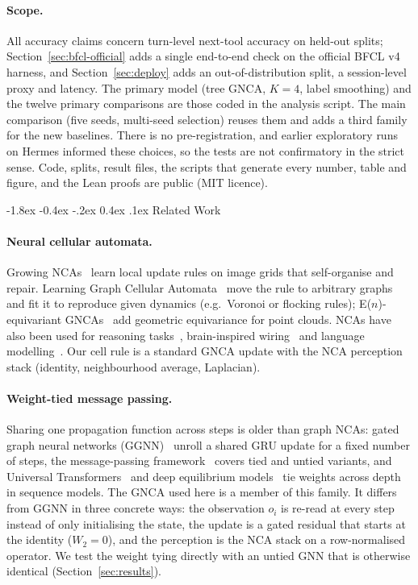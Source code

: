 \documentclass[10pt,twocolumn,letterpaper]{article}
\makeatletter
\renewcommand\section{\@startsection {section}{1}{\z@}%
  {-1.8ex \@plus -0.4ex \@minus -.2ex}%
  {0.4ex \@plus.1ex}%
  {\normalfont\normalsize\bfseries}}
\makeatother
\begin{document}
\paragraph{Scope.} All accuracy claims concern turn-level next-tool accuracy on held-out splits; Section~\ref{sec:bfcl-official} adds a single end-to-end check on the official BFCL v4 harness, and Section~\ref{sec:deploy} adds an out-of-distribution split, a session-level proxy and latency. The primary model (tree GNCA, $K{=}4$, label smoothing) and the twelve primary comparisons are those coded in the analysis script. The main comparison (five seeds, multi-seed selection) reuses them and adds a third family for the new baselines. There is no pre-registration, and earlier exploratory runs on Hermes informed these choices, so the tests are not confirmatory in the strict sense. Code, splits, result files, the scripts that generate every number, table and figure, and the Lean proofs are public (MIT licence).

\section{Related Work}\label{sec:related-work}
\paragraph{Neural cellular automata.} Growing NCAs~\cite{mordvintsev2020growing} learn local update rules on image grids that self-organise and repair. Learning Graph Cellular Automata~\cite{grattarola2021learning} move the rule to arbitrary graphs and fit it to reproduce given dynamics (e.g.\ Voronoi or flocking rules); E($n$)-equivariant GNCAs~\cite{gala2023equivariant} add geometric equivariance for point clouds. NCAs have also been used for reasoning tasks~\cite{etcheverry2026reasoning}, brain-inspired wiring~\cite{pio2026brainca} and language modelling~\cite{mittal2026textnca,lee2026training}. Our cell rule is a standard GNCA update with the NCA perception stack (identity, neighbourhood average, Laplacian).
\paragraph{Weight-tied message passing.} Sharing one propagation function across steps is older than graph NCAs: gated graph neural networks (GGNN)~\cite{li2016ggnn} unroll a shared GRU update for a fixed number of steps, the message-passing framework~\cite{gilmer2017mpnn} covers tied and untied variants, and Universal Transformers~\cite{dehghani2019universal} and deep equilibrium models~\cite{bai2019deq} tie weights across depth in sequence models. The GNCA used here is a member of this family. It differs from GGNN in three concrete ways: the observation $o_i$ is re-read at every step instead of only initialising the state, the update is a gated residual that starts at the identity ($W_2{=}0$), and the perception is the NCA stack on a row-normalised operator. We test the weight tying directly with an untied GNN that is otherwise identical (Section~\ref{sec:results}).
\end{document}
